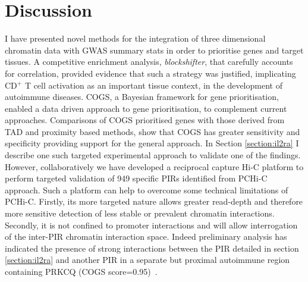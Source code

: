 \documentclass[a4paper,11pt]{report}
\begin{document}

\chapter{Discussion}

I have presented novel methods for the integration of three dimensional chromatin data with GWAS summary stats in order to prioritise genes and target tissues. A competitive enrichment analysis, \textit{blockshifter}, that carefully accounts for correlation, provided evidence that such a strategy was justified, implicating CD${^+}$ T cell activation as an important tissue context, in the development of autoimmune diseases.  COGS, a Bayesian framework for gene  prioritisation, enabled a data driven approach to gene prioritisation, to complement current approaches.  Comparisons of COGS prioritised genes with those derived from TAD and proximity based methods,  show that COGS has greater sensitivity and specificity providing support for the general approach.  In Section \ref{section:il2ra} I describe one such targeted experimental approach to validate one of the findings. However, collaboratively we have developed a reciprocal capture Hi-C platform to perform targeted validation of 949 specific PIRs identified from PCHi-C approach. Such a platform can  help to overcome some technical limitations of PCHi-C. Firstly, its more targeted nature allows greater read-depth and therefore more sensitive detection of less stable or prevalent chromatin interactions. Secondly, it is not confined to promoter interactions and will allow interrogation of the inter-PIR chromatin interaction space. Indeed preliminary analysis has indicated the presence of strong interactions between the PIR detailed in section \ref{section:il2ra} and another PIR in a separate but proximal autoimmune region containing PRKCQ (COGS score=0.95)~\citep{LoweCooperBruskoEtAl2007}. 
\end{document}
